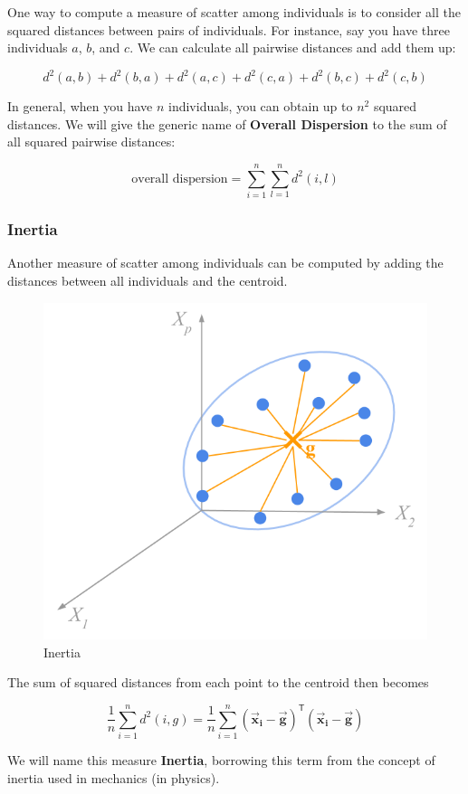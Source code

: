 \documentclass[]{book}
\begin{document}
One way to compute a measure of scatter among individuals is to consider all the
squared distances between pairs of individuals. For instance, say you have three
individuals \(a\), \(b\), and \(c\). We can calculate all pairwise distances and add
them up:

\[
d^2(a,b) + d^2(b,a) + d^2(a,c) + d^2(c,a) + d^2(b,c) + d^2(c,b)
\]

In general, when you have \(n\) individuals, you can obtain up to \(n^2\) squared
distances. We will give the generic name of \textbf{Overall Dispersion} to the sum
of all squared pairwise distances:

\[
\text{overall dispersion} = \sum_{i=1}^{n} \sum_{l=1}^{n} d^2(i,l)
\]

\hypertarget{inertia}{%
\subsubsection*{Inertia}\label{inertia}}

Another measure of scatter among individuals can be computed by adding the
distances between all individuals and the centroid.

\begin{figure}

{\centering \includegraphics[width=0.55\linewidth]{images/duality/cloud-inertia} 

}

\caption{Inertia}\label{fig:unnamed-chunk-16}
\end{figure}

The sum of squared distances from each point to the centroid then becomes

\[
\frac{1}{n} \sum_{i=1}^{n} d^2(i,g) = \frac{1}{n} \sum_{i=1}^{n} (\mathbf{\vec{x}_i} - \mathbf{\vec{g}})^\mathsf{T} (\mathbf{\vec{x}_i} - \mathbf{\vec{g}})
\]

We will name this measure \textbf{Inertia}, borrowing this term from the concept of
inertia used in mechanics (in physics).
\end{document}
